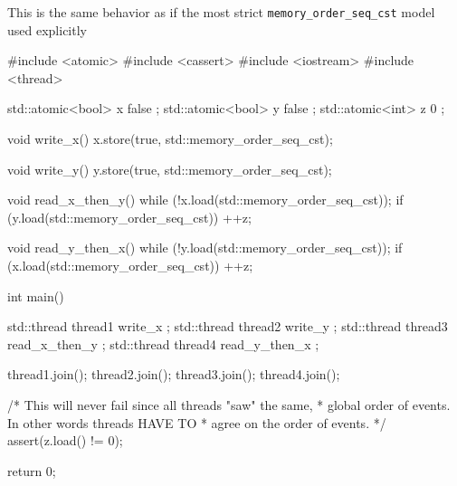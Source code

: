\documentclass[../main]{subfiles}
\begin{document}
    This is the same behavior as if the most strict \texttt{memory\_order\_seq\_cst} model used explicitly
\begin{Code}
    #include <atomic>
    #include <cassert>
    #include <iostream>
    #include <thread>

    std::atomic<bool> x{ false };
    std::atomic<bool> y{ false };
    std::atomic<int> z{ 0 };

    void write_x()
    {
        x.store(true, std::memory_order_seq_cst);
    }

    void write_y()
    {
        y.store(true, std::memory_order_seq_cst);
    }

    void read_x_then_y()
    {
        while (!x.load(std::memory_order_seq_cst));
        if (y.load(std::memory_order_seq_cst))
        {
            ++z;
        }
    }

    void read_y_then_x()
    {
        while (!y.load(std::memory_order_seq_cst));
        if (x.load(std::memory_order_seq_cst))
        {
            ++z;
        }
    }

    int main()
    {
        std::thread thread1{ write_x };
        std::thread thread2{ write_y };
        std::thread thread3{ read_x_then_y };
        std::thread thread4{ read_y_then_x };

        thread1.join();
        thread2.join();
        thread3.join();
        thread4.join();

        /* This will never fail since all threads "saw" the same,
         * global order of events. In other words threads HAVE TO
         * agree on the order of events.
         */
        assert(z.load() != 0);

        return 0;
    }
\end{Code}
\end{document}

